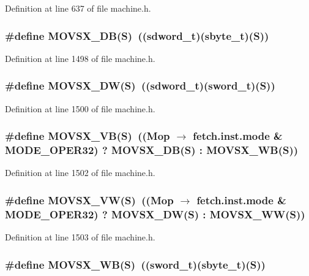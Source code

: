 Definition at line 637 of file machine.h.
\subsubsection[{MOVSX\_\-DB}]{\setlength{\rightskip}{0pt plus 5cm}\#define MOVSX\_\-DB(S)~(({\bf sdword\_\-t})({\bf sbyte\_\-t})(S))}\label{machine_8h_eec6b578b61b1619c849ea5d86a844a7}




Definition at line 1498 of file machine.h.
\subsubsection[{MOVSX\_\-DW}]{\setlength{\rightskip}{0pt plus 5cm}\#define MOVSX\_\-DW(S)~(({\bf sdword\_\-t})({\bf sword\_\-t})(S))}\label{machine_8h_7cddd8fef46afa9d2980fdead6e47438}




Definition at line 1500 of file machine.h.
\subsubsection[{MOVSX\_\-VB}]{\setlength{\rightskip}{0pt plus 5cm}\#define MOVSX\_\-VB(S)~((Mop $\rightarrow$ fetch.inst.mode \& MODE\_\-OPER32) ? MOVSX\_\-DB(S) : MOVSX\_\-WB(S))}\label{machine_8h_5f69697f9c5955cfc24e5832b5d2de50}




Definition at line 1502 of file machine.h.
\subsubsection[{MOVSX\_\-VW}]{\setlength{\rightskip}{0pt plus 5cm}\#define MOVSX\_\-VW(S)~((Mop $\rightarrow$ fetch.inst.mode \& MODE\_\-OPER32) ? MOVSX\_\-DW(S) : MOVSX\_\-WW(S))}\label{machine_8h_5f9fd644f8e3052ef6f550192d551263}




Definition at line 1503 of file machine.h.
\subsubsection[{MOVSX\_\-WB}]{\setlength{\rightskip}{0pt plus 5cm}\#define MOVSX\_\-WB(S)~(({\bf sword\_\-t})({\bf sbyte\_\-t})(S))}\label{machine_8h_87e94afe8087b0d0feec3fcd296a98b4}




